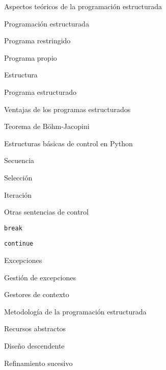 \begin{longenum}
    \begin{longenum}
        \item Aspectos teóricos de la programación estructurada
        \begin{longenum}
            \item Programación estructurada
            \item Programa restringido
            \item Programa propio
            \item Estructura
            \item Programa estructurado
            \begin{longenum}
                \item Ventajas de los programas estructurados
            \end{longenum}
            \item Teorema de Böhm-Jacopini
        \end{longenum}
        \item Estructuras básicas de control en Python
        \begin{longenum}
            \item Secuencia
            \item Selección
            \item Iteración
            \item Otras sentencias de control
            \begin{longenum}
                \item \texttt{break}
                \item \texttt{continue}
                \item Excepciones
                \begin{longenum}
                    \item Gestión de excepciones
                \end{longenum}
                \item Gestores de contexto
            \end{longenum}
        \end{longenum}
        \item Metodología de la programación estructurada 
        \begin{longenum}
            \item Recursos abstractos
            \item Diseño descendente
            \item Refinamiento sucesivo
        \end{longenum}

\end{longenum}
\end{longenum}
